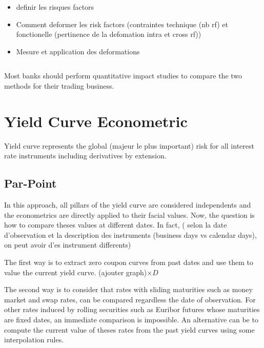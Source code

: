 \documentclass[3pt]{article}
\begin{document}
\begin{itemize}
\item definir les risques factors

\item Comment deformer les risk factors (contraintes technique (nb rf) et
fonctionelle (pertinence de la defomation intra et cross rf))

\item Mesure et application des deformations
\end{itemize}

$\ \ \ \ \ $

Most banks should perform quantitative impact studies to compare the two
methods for their trading business.

\section{Yield Curve Econometric}

Yield curve represents the global (majeur le plus important) risk for all
interest rate instruments including derivatives by extension. 

\subsection{Par-Point}

In this approach, all pillars of the yield curve are considered independents
and the econometrics are directly applied to their facial values. Now, the
question is how to compare theses values at different dates. In fact, (
selon la date d'observation et la description des instruments (business days
vs calendar days), on peut avoir d'es instrument differents)

\bigskip

The first way is to extract zero coupon curves from past dates and use them
to value the current yield curve. (ajouter graph)$\times D$

\bigskip

\bigskip

\bigskip

The second way is to consider that rates with sliding maturities such as
money market and swap rates, can be compared regardless the date of
observation. For other rates induced by rolling securities such as Euribor
futures whose maturities are fixed dates, an immediate comparison is
impossible. An alternative can be to compute the current value of theses
rates from the past yield curves using some interpolation rules.
\end{document}
